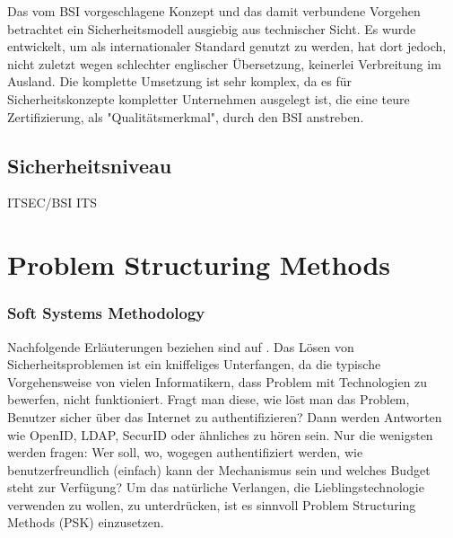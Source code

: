 \documentclass[11pt,a4paper]{report}
\begin{document}
Das vom BSI vorgeschlagene Konzept und das damit verbundene Vorgehen betrachtet ein Sicherheitsmodell ausgiebig aus technischer Sicht. Es wurde entwickelt, um als internationaler Standard genutzt zu werden, hat dort jedoch, nicht zuletzt wegen schlechter englischer Übersetzung, keinerlei Verbreitung im Ausland. Die komplette Umsetzung ist sehr komplex, da es für Sicherheitskonzepte kompletter Unternehmen ausgelegt ist, die eine teure Zertifizierung, als "Qualitätsmerkmal", durch den BSI anstreben.

\subsection{Sicherheitsniveau}

ITSEC/BSI ITS

\section{Problem Structuring Methods}

\subsubsection{Soft Systems Methodology} \label{sec:ssm}

Nachfolgende Erläuterungen beziehen sind auf \cite{gutmann9}. 
Das Lösen von Sicherheitsproblemen ist ein kniffeliges Unterfangen, da die typische Vorgehensweise von vielen Informatikern, dass Problem mit Technologien zu bewerfen, nicht funktioniert. Fragt man diese, wie löst man das Problem, Benutzer sicher über das Internet zu authentifizieren? Dann werden Antworten wie OpenID, LDAP, SecurID oder ähnliches zu hören sein. Nur die wenigsten werden fragen: Wer soll, wo, wogegen authentifiziert werden, wie benutzerfreundlich (einfach) kann der Mechanismus sein und welches Budget steht zur Verfügung? Um das natürliche Verlangen, die Lieblingstechnologie verwenden zu wollen, zu unterdrücken, ist es sinnvoll Problem Structuring Methods (PSK) einzusetzen.
\end{document}
